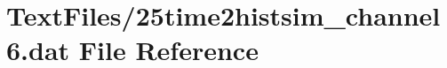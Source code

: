 \hypertarget{25time2histsim__channel6_8dat}{}\section{Text\+Files/25time2histsim\+\_\+channel6.dat File Reference}
\label{25time2histsim__channel6_8dat}
